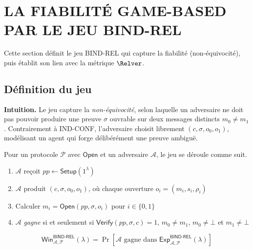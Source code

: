 \section{LA FIABILIT\'E GAME-BASED PAR LE JEU BIND-REL}
\label{sec:gamebased_fiabilite}
\begin{sloppypar}

Cette section d\'efinit le jeu BIND-REL qui capture la fiabilit\'e (non-\'equivocit\'e),
puis \'etablit son lien avec la m\'etrique $\Relver$.

\subsection{D\'efinition du jeu}

\noindent\textbf{Intuition.} Le jeu capture la \emph{non-\'equivocit\'e},
selon laquelle un adversaire ne doit pas pouvoir produire une preuve $\sigma$ ouvrable
sur deux messages distincts $m_0 \neq m_1$. Contrairement \`a IND-CONF,
l'adversaire choisit librement $(c, \sigma, o_0, o_1)$, mod\'elisant
un agent qui forge d\'elib\'er\'ement une preuve ambiguë.

\begin{definition}\label{def:ann_bind_rel}
Pour un protocole $\mathcal{P}$ avec $\mathsf{Open}$ et un adversaire
$\mathcal{A}$, le jeu se d\'eroule comme suit.
\begin{enumerate}
\item $\mathcal{A}$ reçoit $pp \leftarrow \mathsf{Setup}(1^\lambda)$
\item $\mathcal{A}$ produit $(c, \sigma, o_0, o_1)$, o\`u chaque ouverture
      $o_i = (m_i, s_i, \rho_i)$
\item Calculer $m_i = \mathsf{Open}(pp, \sigma, o_i)$ pour $i \in \{0,1\}$
\item $\mathcal{A}$ \emph{gagne} si et seulement si
  $\mathsf{Verify}(pp,\sigma,c)=1$,
  $m_0 \neq m_1$,
  $m_0 \neq \bot$ et $m_1 \neq \bot$
\end{enumerate}
\begin{equation}
\mathsf{Win}^{\mathsf{BIND\text{-}REL}}_{\mathcal{A},\mathcal{P}}(\lambda)
= \Pr\!\left[\mathcal{A} \text{ gagne dans }
\mathsf{Exp}^{\mathsf{BIND\text{-}REL}}_{\mathcal{A},\mathcal{P}}(\lambda)
\right]
\end{equation}
\end{definition}


\end{sloppypar}
